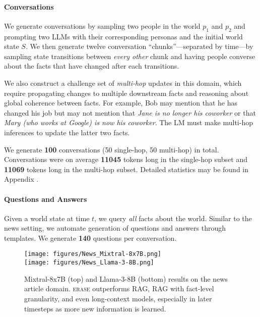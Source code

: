 \documentclass[11pt]{article}
\newcommand{\ourmethod}{\textsc{erase}\xspace}
\begin{document}
\paragraph{Conversations}
We generate conversations by sampling two people in the world $p_1$ and $p_2$ and prompting two LLMs with their corresponding personas and the initial world state $S$.
We then generate twelve conversation ``chunks''---separated by time---by sampling state transitions between \textit{every other} 
chunk and having people converse about the facts that have changed after each transitions.

We also construct a challenge set of \textit{multi-hop} updates in this domain, which require propagating changes to multiple downstream facts and reasoning about global coherence between facts. For example, Bob may mention that he has changed his job but may not mention that \textit{Jane is no longer his coworker} or that \textit{Mary (who works at Google) is now his coworker}. The LM must make multi-hop inferences to update the latter two facts.

We generate \textbf{100} conversations (50 single-hop, 50 multi-hop) in total. Conversations were on average \textbf{11045} tokens long in the single-hop subset and \textbf{11069} tokens long in the multi-hop subset. Detailed statistics may be found in Appendix .


\paragraph{Questions and Answers}
Given a world state at time $t$, we query \textit{all} facts about the world. Similar to the news setting, we automate generation of questions and answers through templates. We generate \textbf{140} questions per conversation.














\begin{figure}[t!]
    \centering
    \texttt{[image: figures/News\_Mixtral-8x7B.png]} \\
    \texttt{[image: figures/News\_Llama-3-8B.png]}
    \caption{Mixtral-8x7B (top) and Llama-3-8B (bottom) results on the news article domain. %
    \ourmethod outperforms RAG, RAG with fact-level granularity, and even long-context models, especially in later timesteps as more new information is learned.}
    \label{fig:wiki_results}
\end{figure}
\end{document}
